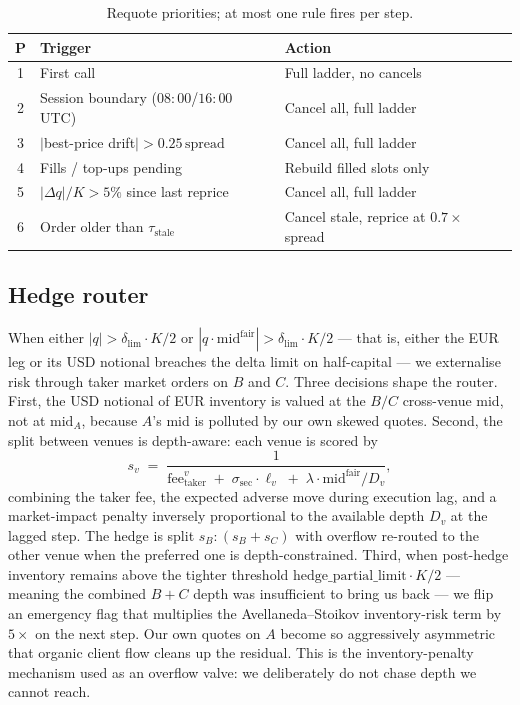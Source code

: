 \begin{table}[H]
  \centering
  \footnotesize
  \begin{tabular}{cll}
    \toprule
    \textbf{P} & \textbf{Trigger} & \textbf{Action} \\
    \midrule
    1 & First call & Full ladder, no cancels \\
    2 & Session boundary ($08{:}00$/$16{:}00$ UTC) & Cancel all, full ladder \\
    3 & $|$best-price drift$|>0.25\,\mathrm{spread}$ & Cancel all, full ladder \\
    4 & Fills / top-ups pending & Rebuild filled slots only \\
    5 & $|\Delta q|/K>5\%$ since last reprice & Cancel all, full ladder \\
    6 & Order older than $\tau_{\mathrm{stale}}$ & Cancel stale, reprice at $0.7\times$ spread \\
    \bottomrule
  \end{tabular}
  \caption{Requote priorities; at most one rule fires per step.}
  \label{tab:quoter-requote}
\end{table}

\subsection{Hedge router}
\label{sec:quoter-hedge}

When either $|q| > \delta_{\mathrm{lim}}\cdot K/2$ or
$|q \cdot \mathrm{mid}^{\mathrm{fair}}| > \delta_{\mathrm{lim}}\cdot K/2$
--- that is, either the EUR leg or its USD notional breaches the
delta limit on half-capital --- we externalise risk through taker
market orders on $B$ and $C$. Three decisions shape the router.
First, the USD notional of EUR inventory is valued at the $B/C$
cross-venue mid, not at $\mathrm{mid}_A$, because $A$'s mid is
polluted by our own skewed quotes. Second, the split between
venues is depth-aware: each venue is scored by
\[
  s_v \;=\; \frac{1}{\mathrm{fee}^v_{\mathrm{taker}}
                      \;+\; \sigma_{\mathrm{sec}} \cdot \ell_v
                      \;+\; \lambda \cdot \mathrm{mid}^{\mathrm{fair}}/D_v},
\]
combining the taker fee, the expected adverse move during execution
lag, and a market-impact penalty inversely proportional to the
available depth $D_v$ at the lagged step. The hedge is split
$s_B:(s_B+s_C)$ with overflow re-routed to the other venue when the
preferred one is depth-constrained. Third, when post-hedge inventory
remains above the tighter threshold $\mathrm{hedge\_partial\_limit}\cdot K/2$
--- meaning the combined $B{+}C$ depth was insufficient to bring us
back --- we flip an emergency flag that multiplies the
Avellaneda--Stoikov inventory-risk term by $5\times$ on the next step.
Our own quotes on $A$ become so aggressively asymmetric that organic
client flow cleans up the residual. This is the
\citet{gueant2013dealing} inventory-penalty mechanism used as an
overflow valve: we deliberately do not chase depth we cannot reach.

